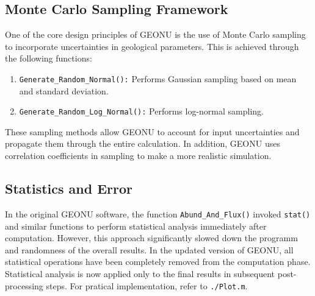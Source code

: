 			\subsection{Monte Carlo Sampling Framework}
				One of the core design principles of GEONU is the use of Monte Carlo sampling to incorporate uncertainties in geological parameters. This is achieved through the following functions:
					\begin{enumerate}
						\item \texttt{Generate\_Random\_Normal():} Performs Gaussian sampling based on mean and standard deviation.
						\item \texttt{Generate\_Random\_Log\_Normal():} Performs log-normal sampling.
					\end{enumerate}
				These sampling methods allow GEONU to account for input uncertainties and propagate them through the entire calculation. In addition, GEONU uses correlation coefficients in sampling to make a more realistic simulation.
			\subsection{Statistics and Error}
				In the original GEONU software, the function \texttt{Abund\_And\_Flux()} invoked \texttt{stat()} and similar functions to perform statistical analysis immediately after computation. However, this approach significantly slowed down the programm and  randomness of the overall results. In the updated version of GEONU, all statistical operations have been completely removed from the computation phase. Statistical analysis is now applied only to the final results in subsequent post-processing steps. For pratical implementation, refer to \texttt{./Plot.m}.
